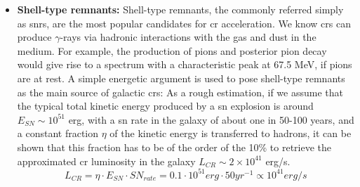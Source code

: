 \documentclass[main.tex]{subfiles}
\begin{document}
\begin{itemize}
    \item \textbf{Shell-type remnants:} Shell-type remnants, the commonly referred simply as \glspl{snr}, are the most popular candidates for \gls{cr} acceleration. We know \glspl{cr} can produce $\gamma$-rays via hadronic interactions with the gas and dust in the medium. For example, the production of pions and posterior pion decay would give rise to a spectrum with a characteristic peak at 67.5 MeV, if pions are at rest. 
A simple energetic argument is used to pose shell-type remnants as the main source of galactic \glspl{cr}: As a rough estimation, if we assume that the typical total kinetic energy produced by a \gls{sn} explosion is around $E_{SN} \sim 10^{51}$ erg, with a \gls{sn} rate in the galaxy of about one in 50-100 years, and a constant fraction $\eta$ of the kinetic energy is transferred to hadrons, it can be shown that this fraction has to be of the order of the 10\% to retrieve the approximated \gls{cr} luminosity in the galaxy $L_{CR} \sim 2 \times 10^{41}$ erg/s.
    \begin{equation}
        L_{CR} = \eta \cdot E_{SN} \cdot SN_{rate} = 0.1 \cdot 10^{51} erg \cdot 50 yr^{-1} \propto 10^{41} erg/s
    \end{equation}
    

\end{itemize}
\end{document}
